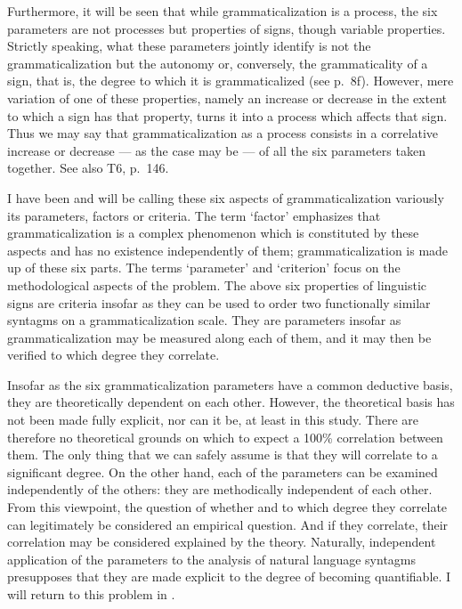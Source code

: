 Furthermore, it will be seen that while grammaticalization is a process, the six parameters are not processes but properties of signs, though variable properties. Strictly speaking, what these parameters jointly identify is not the grammaticalization but the autonomy or, conversely, the grammaticality of a sign, that is, the degree to which it is grammaticalized (see p.~8f). However, mere variation of one of these properties, namely an increase or decrease in the extent to which a sign has that property, turns it into a process which affects that sign. Thus we may say that grammaticalization as a process consists in a correlative increase or decrease — as the case may be — of all the six parameters taken together. See also T6, p.~146.

I have been and will be calling these six aspects of grammaticalization variously its parameters, factors or criteria. The term ‘factor’ emphasizes that grammaticalization is a complex phenomenon which is constituted by these aspects and has no existence independently of them; grammaticalization is made up of these six parts. The terms ‘parameter’ and ‘criterion’ focus on the methodological aspects of the problem. The above six properties of linguistic signs are criteria insofar as they can be used to order two functionally similar syntagms on a grammaticalization scale. They are parameters insofar as grammaticalization may be measured along each of them, and it may then be verified to which degree they correlate.

Insofar as the six grammaticalization parameters have a common deductive basis, they are theoretically dependent on each other. However, the theoretical basis has not been made fully explicit, nor can it be, at least in this study. There are therefore no theoretical grounds on which to expect a 100\% correlation between them. The only thing that we can safely assume is that they will correlate to a significant degree. On the other hand, each of the parameters can be examined independently of the others: they are methodically independent of each other. From this viewpoint, the question of whether and to which degree they correlate can legitimately be considered an empirical question. And if they correlate, their correlation may be considered explained by the theory. Naturally, independent application of the parameters to the analysis of natural language syntagms presupposes that they are made explicit to the degree of becoming quantifiable. I will return to this problem in .

